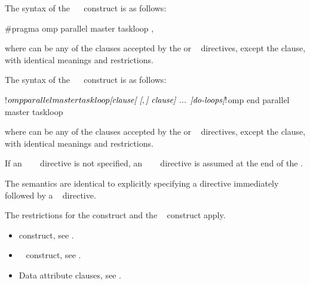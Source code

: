\syntax
\begin{ccppspecific}
The syntax of the ~~ construct is as 
follows:

\begin{ompcPragma}
#pragma omp parallel master taskloop \plc{[clause[ [},\plc{] clause] ... ] new-line}
\end{ompcPragma}

where  can be any of the clauses accepted by the  
or ~ directives, except the  clause,
with identical meanings and restrictions.
\end{ccppspecific}

\begin{fortranspecific}
The syntax of the ~~ construct is as 
follows:

\begin{ompfPragma}
!$omp parallel master taskloop \plc{[clause[ [},\plc{] clause] ... ]}
    \plc{do-loops}
\plc{[}!$omp end parallel master taskloop\plc{]}
\end{ompfPragma}

where  can be any of the clauses accepted by the  or
~ directives, except the  clause,
with identical meanings and restrictions.

If an ~~~ directive is not 
specified, an ~~~ directive 
is assumed at the end of the .
\end{fortranspecific}

\descr
The semantics are identical to explicitly specifying a  directive
immediately followed by a ~ directive.

\restrictions
The restrictions for the  construct and the
~ construct apply.

\crossreferences
\begin{itemize}
\item {} construct, see
.
\item {}~ construct, see
.
\item Data attribute clauses, see
.
\end{itemize}



